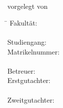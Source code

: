 \begin{titlepage}
\begin{figure}[h]
\end{figure}

\vfill
\vspace{10mm}

\large
\begin{center}
	
	\noindent { 
		\color{uhhred}\textbf{\MakeUppercase \thesisType}
	}
	\vspace{2.0cm}\\
	\textbf{\Large \myTitle} 
	\vspace{2.0cm}\\ vorgelegt von
	\vspace{0.4cm}\\
	\myName
	
\end{center}

\vfill

\begin{tabbing}
	\hspace{10em} \=  \kill
	Fakultät: \>  \faculty \\
	\> \fachbereich \\
	Studiengang: \>  \courseOfStudies \\ %
	Matrikelnummer: \>  \myMatNr \\ \\
	Betreuer: \> \supervisor \\
	Erstgutachter: \> \primaryReferee \\
	\>	\primaryRefereeInst \\
	Zweitgutachter: \> \secondaryReferee \\
	\>	\secondaryRefereeInst \\
\end{tabbing}
	

	
\thispagestyle{empty}
\setcounter{page}{0}

~\\ \vfill \noindent 
\optionalQuote

\end{titlepage}

